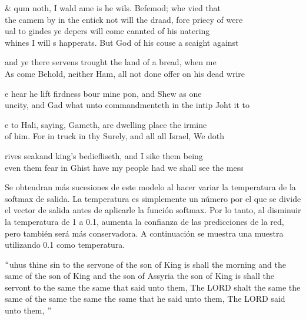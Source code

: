 \begin{table}[htbp]
\begin{center}
\begin{tabular}{&}
\hline
qum noth, I wald ame is he wils. Befemod; whe vied that \\ 
the camem by in the entick not will the draad, fore priecy of were 
\\ \hline
ual to gindes ye depers will come cannted of his natering\\ 
whines I will s happerats. But God of his couse a scaight against 
\\ \hline

and ye there servens trought the land of a bread, when me\\
As come Behold, neither Ham, all not done offer on his dead wrire 
\\ \hline

e hear he lift firdness bour mine pon, and Shew as one \\ 
uncity, and Gad what unto commandmenteth in the intip Joht it to 
\\ \hline

e to Hali, saying, Gameth, are dwelling place the irmine\\
of him. For in truck in thy Surely, and all all Israel, We doth 
\\ \hline

rives seakand king's bediefliseth, and I sike them being\\
even them fear in Ghist have my people had we shall see the mess 
\\ \hline
\end{tabular}
\caption{Generacion de sucesiones para cada época}
\label{Generaciones}
\end{center}
\end{table}


Se obtendran más sucesiones de este modelo al hacer variar la temperatura de la softmax de salida. La temperatura es simplemente un número por el que se divide el vector de salida antes de aplicarle la función softmax. Por lo tanto, al disminuir la temperatura de 1 a 0.1, aumenta la confianza de las predicciones de la red, pero también será más conservadora. A continuación se muestra una muestra utilizando 0.1 como temperatura.
\cite{unreasonable}

\vspace{1em}

$``$uhus thine sin to the servone of the son of King is shall the morning and the same of the son of King and the son of Assyria the son of King is shall the servont to the same the same that said unto them, The LORD shalt the same the same of the same the same the same that he said unto them, The LORD said unto them, $"$

